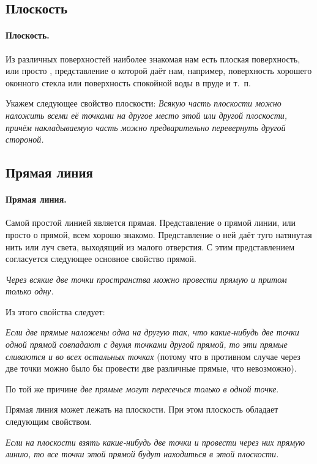 \documentclass[oneside]{book}
\begin{document}
\subsection*{Плоскость}

\paragraph{Плоскость.}\label{1938/3}
Из различных поверхностей наиболее знакомая нам есть плоская поверхность, или просто , представление о которой даёт нам, например, поверхность хорошего оконного стекла или поверхность спокойной воды в пруде и т.~п.

Укажем следующее свойство плоскости:
\textit{Всякую часть плоскости можно наложить всеми её точками на другое место этой или другой плоскости, причём накладываемую часть можно предварительно перевернуть другой стороной.}

\pagebreak%

\subsection*{Прямая линия}

\paragraph{Прямая линия.}\label{1938/4}
Самой простой линией является прямая.
Представление о прямой линии, или просто о прямой, всем хорошо знакомо.
Представление о ней даёт туго натянутая нить или луч света, выходящий из малого отверстия.
С этим представлением согласуется следующее основное свойство прямой.

\textit{Через всякие две точки пространства можно провести прямую и притом только одну.}

Из этого свойства следует:

\textit{Если две прямые наложены одна на другую так, что какие-нибудь две точки одной прямой совпадают с двумя точками другой прямой, то эти прямые сливаются и во всех остальных точках} (потому что в противном случае через две точки можно было бы провести две различные прямые, что невозможно).

По той же причине \textit{две прямые могут пересечься только в одной точке}.

Прямая линия может лежать на плоскости.
При этом плоскость обладает следующим свойством.

\textit{Если на плоскости взять какие-нибудь две точки и провести через них прямую линию, то все точки этой прямой будут находиться в этой плоскости.}
\end{document}
